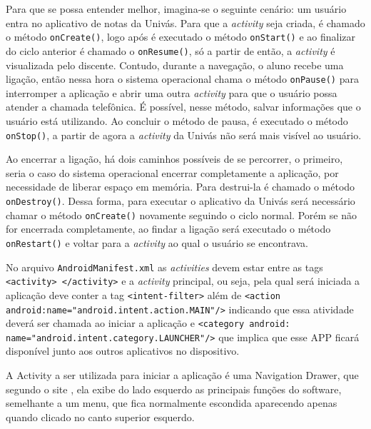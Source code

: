 	\par Para que se possa entender melhor, imagina-se o seguinte cenário: um
usuário entra no aplicativo de notas da Univás. Para que a \textit{activity}
seja criada, é chamado o método \texttt{onCreate()}, logo após é executado o
método \texttt{onStart()} e ao finalizar do ciclo anterior é chamado o
\texttt{onResume()}, só a partir de então, a \textit{activity} é visualizada
pelo discente. Contudo, durante a navegação, o aluno recebe uma ligação, então
nessa hora o sistema operacional chama o método \texttt{onPause()} para
interromper a aplicação e abrir uma outra \textit{activity} para que o usuário
possa atender a chamada telefônica. É possível, nesse método, salvar
informações que o usuário está utilizando. Ao concluir o método de pausa, é
executado o método \texttt{onStop()}, a partir de agora a \textit{activity} da
Univás não será mais visível ao usuário.

 	\par Ao encerrar a ligação, há dois caminhos possíveis de se percorrer, o
primeiro, seria o caso do sistema operacional encerrar completamente a
aplicação, por necessidade de liberar espaço em memória. Para destrui-la é
chamado o método \texttt{onDestroy()}. Dessa forma, para executar o aplicativo
da Univás será necessário chamar o método \texttt{onCreate()} novamente
seguindo o ciclo normal. Porém se não for encerrada completamente, ao findar a
ligação será executado o método \texttt{onRestart()} e voltar para a
\textit{activity} ao qual o usuário se encontrava.

	\par No arquivo \texttt{AndroidManifest.xml} as \textit{activities} devem estar
entre as tags \texttt{<activity> </activity>} e a \textit{activity} principal,
ou seja, pela qual será iniciada a aplicação deve conter a tag
\texttt{<intent-filter>} além de \texttt{<action
android:name="android.intent.action.MAIN"/>} indicando que essa atividade
deverá ser chamada ao iniciar a aplicação e \texttt{<category
android:\\name="android.intent.category.LAUNCHER"/>} que implica que esse
APP ficará disponível junto
aos outros aplicativos no dispositivo.

	\par A Activity a ser utilizada para iniciar a aplicação é uma
Navigation Drawer, que segundo o site , ela exibe
do lado esquerdo as principais funções do software, semelhante a um
menu, que fica normalmente escondida aparecendo apenas quando clicado no canto
superior esquerdo.

